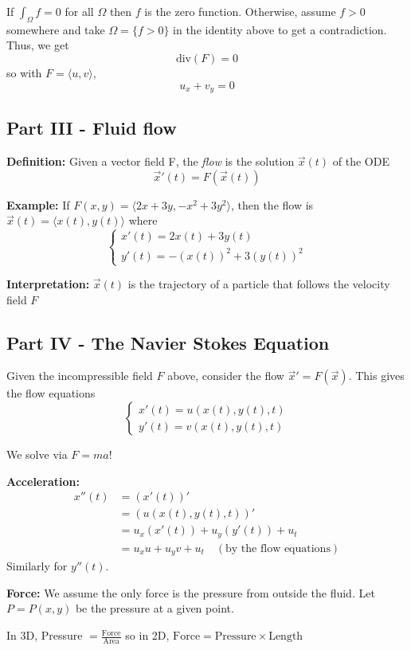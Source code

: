 \documentclass[12pt]{article}
\newcommand{\brak}[1]{\langle #1 \rangle}
\renewcommand{\div}{\text{div}}
\begin{document}
If $\int_{\Omega} f = 0$ for all $\Omega$ then $f$ is the zero function. Otherwise, assume $f > 0$ somewhere and take $\Omega = \{f > 0\}$ in the identity above to get a contradiction. Thus, we get 
\[\div(F) = 0\]
so with $F = \brak{u, v}$, 
\[\boxed{u_x + v_y = 0}\]

\subsection*{Part III - Fluid flow}
\textbf{Definition:} Given a vector field F, the \emph{flow} is the solution $\vec{x}(t)$ of the ODE 
\[\vec{x}'(t) = F(\vec{x}(t))\]

\textbf{Example:} If $F(x, y) = \brak{2x + 3y, -x^2 + 3y^2}$, then the flow is $\vec{x}(t) = \brak{x(t), y(t)}$ where 
\[\begin{cases}
    x'(t) = 2x(t) + 3y(t)\\
    y'(t) = -(x(t))^2 + 3(y(t))^2
\end{cases}\]

\textbf{Interpretation:} $\vec{x}(t)$ is the trajectory of a particle that follows the velocity field $F$

\subsection*{Part IV - The Navier Stokes Equation}
Given the incompressible field $F$ above, consider the flow $\vec{x}' = F(\vec{x})$. This gives the flow equations 
\[\begin{cases}
    x'(t) = u(x(t), y(t), t)\\
    y'(t) = v(x(t), y(t), t)
\end{cases}\]

We solve via $F = ma$!

\textbf{Acceleration:}
\begin{align*}
    x''(t) &= (x'(t))'\\
    &= (u(x(t), y(t), t))'\\
    &= u_x(x'(t)) + u_y(y'(t)) + u_t\\
    &= u_x u + u_y v + u_t \quad (\text{by the flow equations})
\end{align*}
Similarly for $y''(t)$. 

\textbf{Force:} We assume the only force is the pressure from outside the fluid. Let $P = P(x, y)$ be the pressure at a given point. 

In 3D, Pressure $= \frac{\text{Force}}{\text{Area}}$ so in 2D, $\text{Force} = \text{Pressure} \times \text{Length}$
\end{document}
